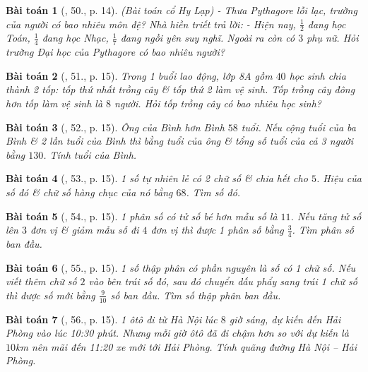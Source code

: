 \documentclass{article}
\newtheorem{baitoan}{Bài toán}
\begin{document}
\begin{baitoan}[\cite{SBT_Toan_8_tap_2}, 50., p. 14]
	\emph{(Bài toán cổ Hy Lạp)} - Thưa Pythagore lỗi lạc, trường của người có bao nhiêu môn đệ? Nhà hiền triết trả lời: - Hiện nay, $\frac{1}{2}$ đang học Toán, $\frac{1}{4}$ đang học Nhạc, $\frac{1}{7}$ đang ngồi yên suy nghĩ. Ngoài ra còn có $3$ phụ nữ. Hỏi trường Đại học của Pythagore có bao nhiêu người?
\end{baitoan}

\begin{baitoan}[\cite{SBT_Toan_8_tap_2}, 51., p. 15]
	Trong 1 buổi lao động, lớp 8A gồm $40$ học sinh chia thành 2 tốp: tốp thứ nhất trồng cây \& tốp thứ 2 làm vệ sinh. Tốp trồng cây đông hơn tốp làm vệ sinh là $8$ người. Hỏi tốp trồng cây có bao nhiêu học sinh?	
\end{baitoan}

\begin{baitoan}[\cite{SBT_Toan_8_tap_2}, 52., p. 15]
	Ông của Bình hơn Bình $58$ tuổi. Nếu cộng tuổi của ba Bình \& 2 lần tuổi của Bình thì bằng tuổi của ông \& tổng số tuổi của cả 3 người bằng $130$. Tính tuổi của Bình.	
\end{baitoan}

\begin{baitoan}[\cite{SBT_Toan_8_tap_2}, 53., p. 15]
	1 số tự nhiên lẻ có 2 chữ số \& chia hết cho $5$. Hiệu của số đó \& chữ số hàng chục của nó bằng $68$. Tìm số đó.
\end{baitoan}

\begin{baitoan}[\cite{SBT_Toan_8_tap_2}, 54., p. 15]
	1 phân số có tử số bé hơn mẫu số là $11$. Nếu tăng tử số lên $3$ đơn vị \& giảm mẫu số đi $4$ đơn vị thì được 1 phân số bằng $\frac{3}{4}$. Tìm phân số ban đầu.
\end{baitoan}

\begin{baitoan}[\cite{SBT_Toan_8_tap_2}, 55., p. 15]
	1 số thập phân có phần nguyên là số có 1 chữ số. Nếu viết thêm chữ số $2$ vào bên trái số đó, sau đó chuyển dấu phẩy sang trái 1 chữ số thì được số mới bằng $\frac{9}{10}$ số ban đầu. Tìm số thập phân ban đầu.
\end{baitoan}

\begin{baitoan}[\cite{SBT_Toan_8_tap_2}, 56., p. 15]
	1 ôtô đi từ Hà Nội lúc $8$ giờ sáng, dự kiến đến Hải Phòng vào lúc 10:30 phút. Nhưng mỗi giờ ôtô đã đi chậm hơn so với dự kiến là $10$\emph{km} nên mãi đến 11:20 xe mới tới Hải Phòng. Tính quãng đường Hà Nội -- Hải Phòng.
\end{baitoan}
\end{document}
